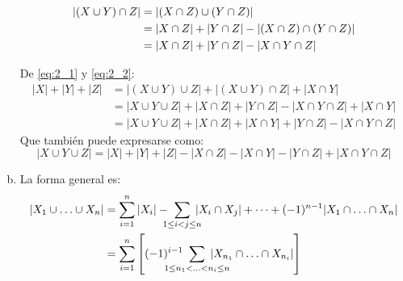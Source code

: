 \begin{enumerate}[a)]
		\begin{align}\label{eq:2_2}
			|(X\cup Y)\cap Z|
				&= |(X\cap Z)\cup(Y\cap Z)| \notag \\
				&= |X\cap Z| + |Y\cap Z| - |(X\cap Z)\cap(Y\cap Z)| \notag \\
				&= |X\cap Z| + |Y\cap Z| - |X\cap Y\cap Z|
		\end{align}
		
		De \eqref{eq:2_1} y \eqref{eq:2_2}:
		\begin{align*}
			|X| + |Y| + |Z|
				&= |(X\cup Y)\cup Z| + |(X\cup Y)\cap Z| + |X\cap Y| \\
				&= |X\cup Y\cup Z| + |X\cap Z| + |Y\cap Z| - |X\cap Y\cap Z| + |X\cap Y| \\
				&= |X\cup Y\cup Z| + |X\cap Z| + |X\cap Y| + |Y\cap Z| - |X\cap Y\cap Z|
		\end{align*}
		Que también puede expresarse como:
		$$|X\cup Y\cup Z| = |X| + |Y| + |Z| - |X\cap Z| - |X\cap Y| - |Y\cap Z| + |X\cap Y\cap Z|$$

	\item La forma general es:
	\begin{align*}
		|X_1\cup\ldots\cup X_n|
			&= \sum_{i=1}^{n} |X_i|
			-\ \sum_{\mathclap{1\leq i<j\leq n}}\; |X_i\cap X_j|
			+ \dots
			+ (-1)^{n-1} |X_1\cap\ldots\cap X_n|
		\\
			&= \sum_{i=1}^n \left[
				(-1)^{i-1}\ \sum_{\mathclap{1\leq n_1<\ldots<n_i\leq n}}\; |X_{n_1}\cap\ldots\cap X_{n_i}|
				\right]
	\end{align*}


\end{enumerate}

